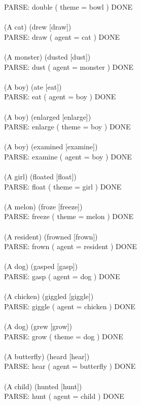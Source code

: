 \documentclass{article} \usepackage{iclr2022_conference,times}
\begin{document}
{PARSE: double ( theme = bowl ) DONE \\
 \\
(A cat) (drew [draw]) \\
PARSE: draw ( agent = cat ) DONE \\
 \\
(A monster) (dusted [dust]) \\
PARSE: dust ( agent = monster ) DONE \\
 \\
(A boy) (ate [eat]) \\
PARSE: eat ( agent = boy ) DONE \\
 \\
(A boy) (enlarged [enlarge]) \\
PARSE: enlarge ( theme = boy ) DONE \\
 \\
(A boy) (examined [examine]) \\
PARSE: examine ( agent = boy ) DONE \\
 \\
(A girl) (floated [float]) \\
PARSE: float ( theme = girl ) DONE \\
 \\
(A melon) (froze [freeze]) \\
PARSE: freeze ( theme = melon ) DONE \\
 \\
(A resident) (frowned [frown]) \\
PARSE: frown ( agent = resident ) DONE \\
 \\
(A dog) (gasped [gasp]) \\
PARSE: gasp ( agent = dog ) DONE \\
 \\
(A chicken) (giggled [giggle]) \\
PARSE: giggle ( agent = chicken ) DONE \\
 \\
(A dog) (grew [grow]) \\
PARSE: grow ( theme = dog ) DONE \\
 \\
(A butterfly) (heard [hear]) \\
PARSE: hear ( agent = butterfly ) DONE \\
 \\
(A child) (hunted [hunt]) \\
PARSE: hunt ( agent = child ) DONE \\
 \\
}
\end{document}
